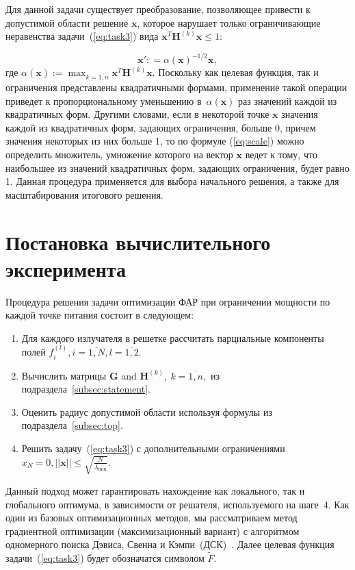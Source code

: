 Для данной задачи существует преобразование, позволяющее привести к допустимой области решение $\textbf{x}$, которое нарушает только ограничивающие неравенства задачи~(\ref{eq:task3}) вида $\textbf{x}^{T}\textbf{H}^{(k)}\textbf{x} \leq 1$:

\begin{equation}
    \textbf{x}': =\alpha(\textbf{x})^{-1/2} \textbf{x} ,
    \label{eq:scale}
\end{equation}
где $\alpha(\textbf{x}):=\max_{k=\overline{1,n}} \textbf{x}^T \textbf{H}^{(k)}\textbf{x}$. Поскольку как целевая функция, так и ограничения представлены квадратичными формами, применение такой операции приведет к пропорциональному уменьшению в~$\alpha(\textbf{x})$ раз значений каждой из квадратичных форм. Другими словами, если в некоторой точке $\textbf{x}$ значения каждой из квадратичных форм, задающих ограничения, больше 0, причем значения некоторых из них больше 1, то по формуле (\ref{eq:scale}) можно определить множитель, умножение которого на вектор $\textbf{x}$ ведет к тому, что наибольшее из значений квадратичных форм, задающих ограничения, будет равно 1. Данная процедура применяется для выбора начального решения, а также для масштабирования итогового решения.

\section{Постановка вычислительного эксперимента}

Процедура решения задачи оптимизации ФАР при ограничении мощности по каждой точке питания состоит в следующем:
%
\begin{enumerate}
  \item Для каждого излучателя в решетке рассчитать парциальные компоненты полей $f_i^{(l)}, i= \overline{1,N}, l=\overline{1,2}$.
  \item Вычислить матрицы $\textbf{G}$ and $\textbf{H}^{(k)},\ k=\overline{1,n},$ из подраздела~\ref{subsec:statement}.
  \item Оценить радиус допустимой области используя формулы из подраздела~\ref{subsec:top}.
  \item Решить задачу~(\ref{eq:task3}) с дополнительными ограничениями $x_N = 0, ||\textbf{x}||\le \sqrt{\frac{N}{\lambda_{\min}}}$.
\end{enumerate}

Данный подход может гарантировать нахождение как локального, так и глобального оптимума, в зависимости от решателя, используемого на шаге~4. Как один из базовых оптимизационных методов, мы рассматриваем метод градиентной оптимизации (максимизационный вариант)
с алгоритмом одномерного поиска Дэвиса, Свенна и Кэмпи~(ДСК)~\cite{himmelblau:nlp}. Далее целевая функция задачи~(\ref{eq:task3}) будет обозначатся символом $\tilde{F}$.

